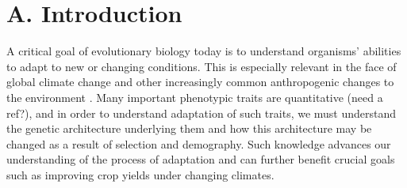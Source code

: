 






\section*{A. Introduction}	%

A critical goal of evolutionary biology today is to understand organisms' abilities to adapt to new or changing conditions. This is especially relevant in the face of global climate change and other increasingly common anthropogenic changes to the environment \citep{Easterling:2000ja}. Many important phenotypic traits are quantitative (need a ref?), and in order to understand adaptation of such traits, we must understand the genetic architecture underlying them and how this architecture may be changed as a result of selection and demography. Such knowledge advances our understanding of the process of adaptation and can further benefit crucial goals such as improving crop yields under changing climates.   %

